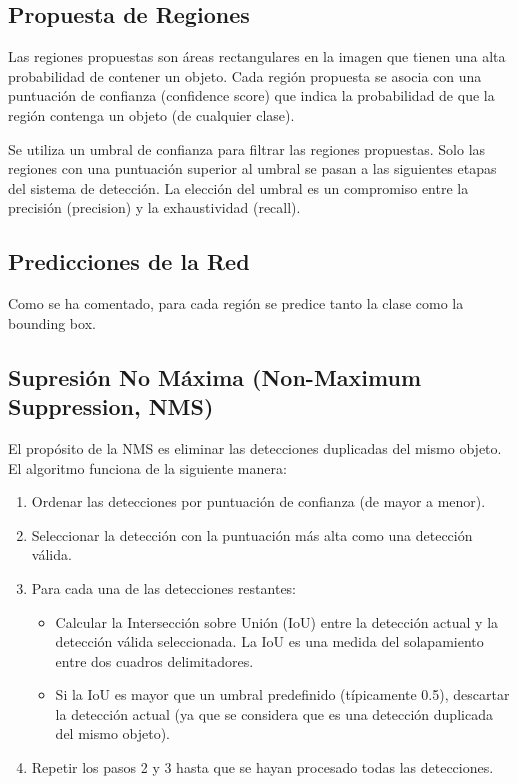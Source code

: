 \documentclass{article}
\begin{document}
\subsection{Propuesta de Regiones}

Las regiones propuestas son áreas rectangulares en la imagen que tienen una alta probabilidad de contener un objeto.  Cada región propuesta se asocia con una puntuación de confianza (confidence score) que indica la probabilidad de que la región contenga un objeto (de cualquier clase).

Se utiliza un umbral de confianza para filtrar las regiones propuestas. Solo las regiones con una puntuación superior al umbral se pasan a las siguientes etapas del sistema de detección.  La elección del umbral es un compromiso entre la precisión (precision) y la exhaustividad (recall).

\subsection{Predicciones de la Red}
Como se ha comentado, para cada región se predice tanto la clase como la bounding box.

\subsection{Supresión No Máxima (Non-Maximum Suppression, NMS)}

El propósito de la NMS es eliminar las detecciones duplicadas del mismo objeto.  El algoritmo funciona de la siguiente manera:

\begin{enumerate}
    \item Ordenar las detecciones por puntuación de confianza (de mayor a menor).
    \item Seleccionar la detección con la puntuación más alta como una detección válida.
    \item Para cada una de las detecciones restantes:
        \begin{itemize}
            \item Calcular la Intersección sobre Unión (IoU) entre la detección actual y la detección válida seleccionada. La IoU es una medida del solapamiento entre dos cuadros delimitadores.
            \item Si la IoU es mayor que un umbral predefinido (típicamente 0.5), descartar la detección actual (ya que se considera que es una detección duplicada del mismo objeto).
        \end{itemize}
    \item Repetir los pasos 2 y 3 hasta que se hayan procesado todas las detecciones.
\end{enumerate}
\end{document}
